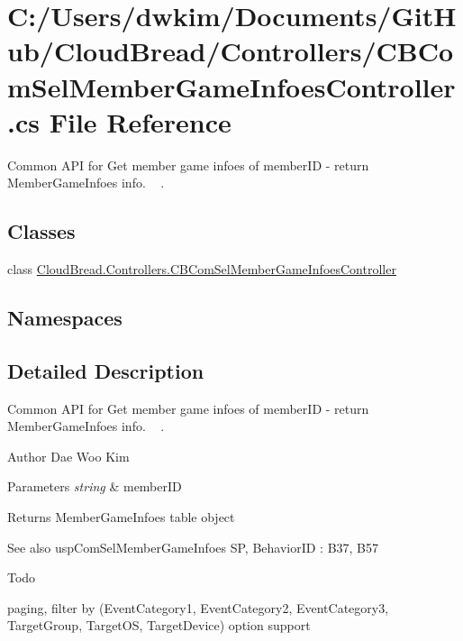 \hypertarget{a00128}{}\section{C\+:/\+Users/dwkim/\+Documents/\+Git\+Hub/\+Cloud\+Bread/\+Controllers/\+C\+B\+Com\+Sel\+Member\+Game\+Infoes\+Controller.cs File Reference}
\label{a00128}


Common A\+PI for Get member game infoes of member\+ID -\/ return Member\+Game\+Infoes info. ~\newline
.  


\subsection*{Classes}
\begin{DoxyCompactItemize}
\item 
class \hyperlink{a00017}{Cloud\+Bread.\+Controllers.\+C\+B\+Com\+Sel\+Member\+Game\+Infoes\+Controller}
\end{DoxyCompactItemize}
\subsection*{Namespaces}
\begin{DoxyCompactItemize}
\end{DoxyCompactItemize}


\subsection{Detailed Description}
Common A\+PI for Get member game infoes of member\+ID -\/ return Member\+Game\+Infoes info. ~\newline
. 

\begin{DoxyAuthor}{Author}
Dae Woo Kim 
\end{DoxyAuthor}

\begin{DoxyParams}{Parameters}
{\em string} & member\+ID \\
\hline
\end{DoxyParams}
\begin{DoxyReturn}{Returns}
Member\+Game\+Infoes table object 
\end{DoxyReturn}
\begin{DoxySeeAlso}{See also}
usp\+Com\+Sel\+Member\+Game\+Infoes SP, Behavior\+ID \+: B37, B57 
\end{DoxySeeAlso}
\begin{DoxyRefDesc}{Todo}
\item[\hyperlink{a00001__todo000006}{Todo}]paging, filter by (Event\+Category1, Event\+Category2, Event\+Category3, Target\+Group, Target\+OS, Target\+Device) option support \end{DoxyRefDesc}
